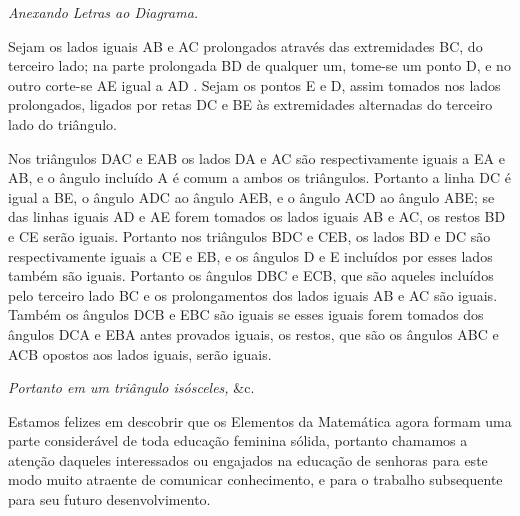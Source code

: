 \documentclass[booklanguage=brazilian]{byrnebook}
\begin{document}
\qedNB

\begin{center}
\emph{Anexando Letras ao Diagrama.}
\end{center}

Sejam os lados iguais AB e AC prolongados através das extremidades BC, do terceiro lado; na parte prolongada BD de qualquer um, tome-se um ponto D, e no outro corte-se AE igual a AD . Sejam os pontos E e D, assim tomados nos lados prolongados, ligados por retas DC e BE às extremidades alternadas do terceiro lado do triângulo.

Nos triângulos DAC e EAB os lados DA e AC são respectivamente iguais a EA e AB, e o ângulo incluído A é comum a ambos os triângulos. Portanto  a linha DC é igual a BE, o ângulo ADC ao ângulo AEB, e o ângulo ACD ao ângulo ABE; se das linhas iguais AD e AE forem tomados os lados iguais AB e AC, os restos BD e CE serão iguais. Portanto nos triângulos BDC e CEB, os lados BD e DC são respectivamente iguais a CE e EB, e os ângulos D e E incluídos por esses lados também são iguais. Portanto  os ângulos DBC e ECB, que são aqueles incluídos pelo terceiro lado BC e os prolongamentos dos lados iguais AB e AC são iguais. Também os ângulos DCB e EBC são iguais se esses iguais forem tomados dos ângulos DCA e EBA antes provados iguais, os restos, que são os ângulos ABC e ACB opostos aos lados iguais, serão iguais.

\emph{Portanto em um triângulo isósceles,} \&c.

\qedNB


Estamos felizes em descobrir que os Elementos da Matemática agora formam uma parte considerável de toda educação feminina sólida, portanto chamamos a atenção daqueles interessados ou engajados na educação de senhoras para este modo muito atraente de comunicar conhecimento, e para o trabalho subsequente para seu futuro desenvolvimento.

\end{document}

